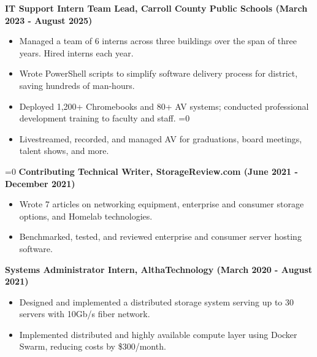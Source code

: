\textbf{IT Support Intern Team Lead, Carroll County Public Schools \hfill (March 2023 - August 2025)}

\begin{itemize}[noitemsep]
    \item Managed a team of 6 interns across three buildings over the span of three years. Hired interns each year.
    \item Wrote PowerShell scripts to simplify software delivery process for district, saving hundreds of man-hours.
    \item Deployed 1,200+ Chromebooks and 80+ AV systems; conducted professional development training to faculty and staff.
\ifnum{}=0
    \item Livestreamed, recorded, and managed AV for graduations, board meetings, talent shows, and more.
\fi
\end{itemize}

\ifnum{}=0
    \textbf{Contributing Technical Writer, StorageReview.com \hfill (June 2021 - December 2021)}

    \begin{itemize}[noitemsep]
        \item Wrote 7 articles on networking equipment, enterprise and consumer storage options, and Homelab technologies.
        \item Benchmarked, tested, and reviewed enterprise and consumer server hosting software.
    \end{itemize}
\fi

\textbf{Systems Administrator Intern, AlthaTechnology \hfill (March 2020 - August 2021)}

\begin{itemize}[noitemsep]
    \item Designed and implemented a distributed storage system serving up to 30 servers with 10Gb/s fiber network.
    \item Implemented distributed and highly available compute layer using Docker Swarm, reducing costs by \$300/month.
\end{itemize}

